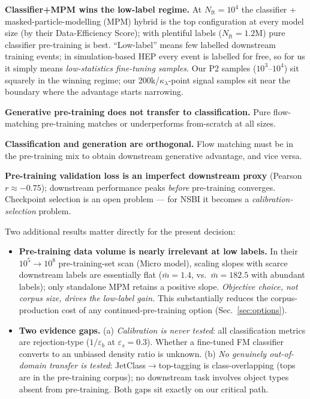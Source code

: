 \documentclass[11pt]{article}
\newcommand{\kl}{\ensuremath{\kappa_\lambda}}
\newcommand{\Nft}{\ensuremath{N_{\mathrm{ft}}}}
\begin{document}
\begin{description}[leftmargin=2.2em]
\item[F1] \textbf{Classifier+MPM wins the low-label regime.} At
  $\Nft=10^4$ the classifier + masked-particle-modelling (MPM) hybrid is the
  top configuration at every model size (by their Data-Efficiency Score);
  with plentiful labels ($\Nft=1.2$M) pure classifier pre-training is best.
  ``Low-label'' means few labelled downstream training events; in
  simulation-based HEP every event is labelled for free, so for us it simply
  means \emph{low-statistics fine-tuning samples}. Our P2 samples
  ($10^3$--$10^4$) sit squarely in the winning regime; our 200k/\kl-point
  signal samples sit near the boundary where the advantage starts narrowing.
\item[F2] \textbf{Generative pre-training does not transfer to
  classification.} Pure flow-matching pre-training matches or underperforms
  from-scratch at all sizes.
\item[F3] \textbf{Classification and generation are orthogonal.}
  Flow matching must be in the pre-training mix to obtain downstream
  generative advantage, and vice versa.
\item[F4] \textbf{Pre-training validation loss is an imperfect downstream
  proxy} (Pearson $r\approx-0.75$); downstream performance peaks
  \emph{before} pre-training converges. Checkpoint selection is an open
  problem --- for NSBI it becomes a \emph{calibration-selection} problem.
\end{description}

Two additional results matter directly for the present decision:
\begin{itemize}
\item \textbf{Pre-training data volume is nearly irrelevant at low labels.}
  In their $10^5\!\to\!10^8$ pre-training-set scan (Micro model), scaling
  slopes with scarce downstream labels are essentially flat
  ($\bar m = 1.4$, vs.\ $\bar m = 182.5$ with abundant labels); only
  standalone MPM retains a positive slope. \emph{Objective choice, not
  corpus size, drives the low-label gain.} This substantially reduces the
  corpus-production cost of any continued-pre-training option
  (Sec.~\ref{sec:options}).
\item \textbf{Two evidence gaps.} (a) \emph{Calibration is never tested}:
  all classification metrics are rejection-type ($1/\varepsilon_b$ at
  $\varepsilon_s=0.3$). Whether a fine-tuned FM classifier converts to an
  unbiased density ratio is unknown. (b) \emph{No genuinely out-of-domain
  transfer is tested}: JetClass$\to$top-tagging is class-overlapping (tops
  are in the pre-training corpus); no downstream task involves object types
  absent from pre-training. Both gaps sit exactly on our critical path.
\end{itemize}
\end{document}
